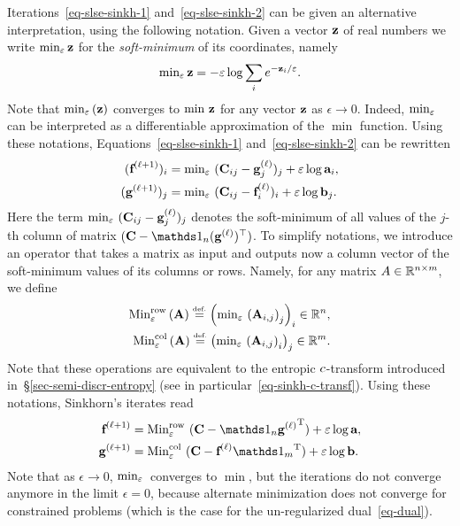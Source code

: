  
 
Iterations~\eqref{eq-slse-sinkh-1} and~\eqref{eq-slse-sinkh-2} can be given an alternative interpretation, using the following notation. Given a vector $\mathrm{\textbf{\upshape z}}$ of real numbers we write $\text{min}_\varepsilon\,\mathrm{\textbf{\upshape z}}$ for the \emph{soft-minimum} of its coordinates, namely
$$
\text{min}_\varepsilon\,\mathrm{\textbf{\upshape z}}= -\varepsilon \log \sum_i e^{-\mathrm{\textbf{\upshape z}}_i/\varepsilon}.
$$
Note that $\text{min}_\varepsilon\,(\mathrm{\textbf{\upshape z}})$ converges to $\min\,\mathrm{\textbf{\upshape z}}$ for any vector $\mathrm{\textbf{\upshape z}}$ as $\epsilon\rightarrow 0$. Indeed, $\text{min}_\varepsilon\,$ can be interpreted as a differentiable approximation of the $\min$ function. Using these notations, Equations~\eqref{eq-slse-sinkh-1} and~\eqref{eq-slse-sinkh-2} can be rewritten
\begin{align}
\label{eq-slse-smin-1}(\mathrm{\textbf{\upshape f}}^{(\ell+1)})_i &= \text{min}_\varepsilon\,\, (\mathrm{\textbf{\upshape C}}_{ij}-\mathrm{\textbf{\upshape g}}^{(\ell)}_j)_j + \varepsilon \log \mathrm{\textbf{\upshape a}}_i, \\
\label{eq-slse-smin-2}(\mathrm{\textbf{\upshape g}}^{(\ell+1)})_j &= \text{min}_\varepsilon\,\, (\mathrm{\textbf{\upshape C}}_{ij}-\mathrm{\textbf{\upshape f}}^{(\ell)}_i)_i + \varepsilon \log \mathrm{\textbf{\upshape b}}_j.
\end{align}
Here the term $\text{min}_\varepsilon\,\, (\mathrm{\textbf{\upshape C}}_{ij}-\mathrm{\textbf{\upshape g}}^{(\ell)}_j)_j$ denotes the soft-minimum of all values of the $j$-th column of matrix $(\C-\ones_n (\it{\gD})^\top )$. To simplify notations, we introduce an operator that takes a matrix as input and outputs now a column vector of the soft-minimum values of its columns or rows. Namely, for any matrix $A\in\mathbb{R}^{n\times m}$, we define
\begin{align*}
	\text{Min}^{\text{row}}_\varepsilon\,(\mathrm{\textbf{\upshape A}}) \stackrel{\mbox{\upshape\tiny def.}}{=} \left( \text{min}_\varepsilon\, \left( \mathrm{\textbf{\upshape A}}_{i,j} \right)_j \right)_i\in\mathbb{R}^n,\\ 
	\text{Min}^{\text{col}}_\varepsilon\,(\mathrm{\textbf{\upshape A}}) \stackrel{\mbox{\upshape\tiny def.}}{=} \left( \text{min}_\varepsilon\, \left( \mathrm{\textbf{\upshape A}}_{i,j} \right)_i \right)_j\in\mathbb{R}^m.
\end{align*}
Note that these operations are equivalent to the entropic $c$-transform introduced in~\S\ref{sec-semi-discr-entropy} (see in particular~\eqref{eq-sinkh-c-transf}).
%
Using these notations, Sinkhorn's iterates read
\begin{align}
	\label{eq-lse-dual-1}\itt{\fD} &= \SMINEr\, (\C-\ones_n\transp{\it{\gD}}) + \epsilon \log \a, \\
	\label{eq-lse-dual-2}\itt{\gD} &= \SMINEc\, (\C-\it{\fD}\transp{\ones_m})  + \epsilon \log \b.
\end{align}
Note that as $\epsilon \rightarrow 0$, $\text{min}_\varepsilon\,$ converges to $\min$, but the iterations do not converge anymore in the limit $\epsilon=0$, because alternate minimization does not converge for constrained problems (which is the case for the un-regularized dual~\eqref{eq-dual}).


